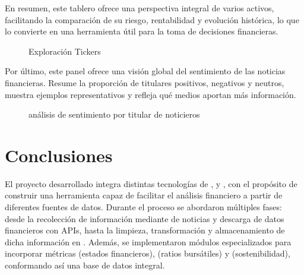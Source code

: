 \documentclass[letterpaper,10pt,spanish]{sphinxmanual}
\begin{document}
\sphinxAtStartPar
En resumen, este tablero ofrece una perspectiva integral de varios activos, facilitando la comparación de su riesgo, rentabilidad y evolución histórica, lo que lo convierte en una herramienta útil para la toma de decisiones financieras.

\begin{figure}[htbp]
\centering
\capstart

\noindent{}
\caption{ Exploración Tickers}\label{\detokenize{ImplementacionAcesorIA:id3}}\end{figure}

\sphinxAtStartPar
Por último, este panel ofrece una visión global del sentimiento de las noticias financieras. Resume la proporción de titulares positivos, negativos y neutros, muestra ejemplos representativos y refleja qué medios aportan más información.

\begin{figure}[htbp]
\centering
\capstart

\noindent{}
\caption{ análisis de sentimiento por titular de noticieros}\label{\detokenize{ImplementacionAcesorIA:id4}}\end{figure}

\sphinxstepscope


\chapter{Conclusiones}
\label{\detokenize{Conclusiones:conclusiones}}\label{\detokenize{Conclusiones::doc}}
\sphinxAtStartPar
El proyecto desarrollado integra distintas tecnologías de ,  y , con el propósito de construir una herramienta capaz de facilitar el análisis financiero a partir de diferentes fuentes de datos. Durante el proceso se abordaron múltiples fases: desde la recolección de información mediante  de noticias y descarga de datos financieros con APIs, hasta la limpieza, transformación y almacenamiento de dicha información en . Además, se implementaron módulos especializados para incorporar métricas  (estados financieros),  (ratios bursátiles) y  (sostenibilidad), conformando así una base de datos integral.
\end{document}

